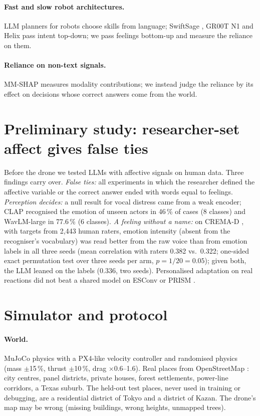 \documentclass[10pt]{article}
\begin{document}
\paragraph{Fast and slow robot architectures.} LLM planners for robots \citep{ahn2022saycan,vemprala2023chatgpt} choose
skills from language; SwiftSage \citep{lin2023swiftsage}, GR00T N1 \citep{gr00t2025} and Helix
\citep{helix2025} pass intent top-down; we pass feelings bottom-up and measure the reliance on them.
\paragraph{Reliance on non-text signals.} MM-SHAP \citep{parcalabescu2023} measures modality contributions; we instead
judge the reliance by its effect on decisions whose correct answers come from the world.

\section{Preliminary study: researcher-set affect gives false ties}\label{sec:prelim}
Before the drone we tested LLMs with affective signals on human data. Three findings carry over.
\emph{False ties:} all experiments in which the researcher defined the affective variable or the correct answer ended with
words equal to feelings. \emph{Perception decides:} a null result for vocal distress came from a weak encoder; CLAP
\citep{elizalde2023clap} recognised the emotion of unseen actors in 46\,\% of cases (8 classes) and WavLM-large
\citep{chen2022wavlm} in 77.6\,\% (6 classes). \emph{A feeling without a name:} on CREMA-D \citep{cao2014cremad}, with targets
from 2,443 human raters, emotion intensity (absent from the recogniser's vocabulary) was read better from the raw voice than from
emotion labels in all three seeds (mean correlation with raters 0.382 vs.\ 0.322; one-sided exact permutation test over three seeds per arm, $p=1/20=0.05$); given both, the
LLM leaned on the labels (0.336, two seeds). Personalised adaptation on real reactions did not beat a shared model on ESConv
\citep{liu2021esconv} or PRISM \citep{kirk2024prism}.

\section{Simulator and protocol}\label{sec:sim}
\paragraph{World.} MuJoCo physics \citep{todorov2012mujoco} with a PX4-like velocity controller and randomised physics (mass
$\pm$15\,\%, thrust $\pm$10\,\%, drag $\times$0.6--1.6). Real places from OpenStreetMap \citep{osm}: city centres, panel
districts, private houses, forest settlements, power-line corridors, a Texas suburb. The held-out test places, never used in
training or debugging, are a residential district of Tokyo and a district of Kazan. The drone's map may be wrong (missing
buildings, wrong heights, unmapped trees).
\end{document}
